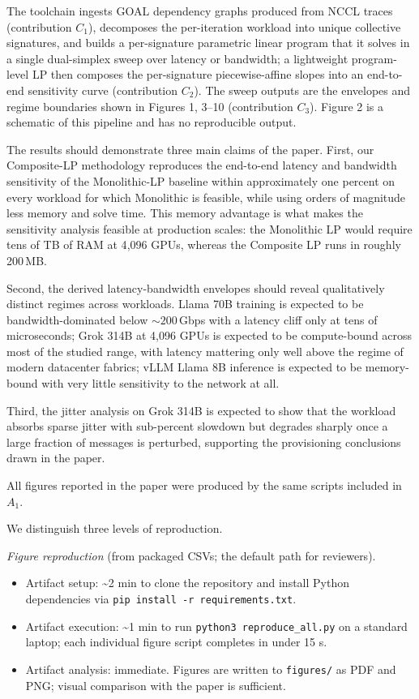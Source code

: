 \documentclass[conference]{IEEEtran}
\begin{document}
The toolchain ingests GOAL dependency graphs produced from NCCL
traces (contribution $C_1$), decomposes the per-iteration workload
into unique collective signatures, and builds a per-signature
parametric linear program that it solves in a single dual-simplex
sweep over latency or bandwidth; a lightweight program-level LP
then composes the per-signature piecewise-affine slopes into an
end-to-end sensitivity curve (contribution $C_2$). The sweep
outputs are the envelopes and regime boundaries shown in Figures
1, 3--10 (contribution $C_3$). Figure 2 is a schematic of this
pipeline and has no reproducible output.

\artexp

The results should demonstrate three main claims of the paper.
First, our Composite-LP methodology reproduces the end-to-end
latency and bandwidth sensitivity of the Monolithic-LP baseline
within approximately one percent on every workload for which
Monolithic is feasible, while using orders of magnitude less memory
and solve time. This memory advantage is what makes the
sensitivity analysis feasible at production scales: the Monolithic
LP would require tens of TB of RAM at 4{,}096 GPUs, whereas the
Composite LP runs in roughly 200\,MB.

Second, the derived latency-bandwidth envelopes should reveal
qualitatively distinct regimes across workloads. Llama 70B training
is expected to be bandwidth-dominated below ${\sim}200$\,Gbps with a
latency cliff only at tens of microseconds; Grok 314B at
4{,}096 GPUs is expected to be compute-bound across most of the
studied range, with latency mattering only well above the regime of
modern datacenter fabrics; vLLM Llama 8B inference is expected to
be memory-bound with very little sensitivity to the network at all.

Third, the jitter analysis on Grok 314B is expected to show that
the workload absorbs sparse jitter with sub-percent slowdown but
degrades sharply once a large fraction of messages is perturbed,
supporting the provisioning conclusions drawn in the paper.

All figures reported in the paper were produced by the same scripts
included in $A_1$.

\arttime

We distinguish three levels of reproduction.

\emph{Figure reproduction} (from packaged CSVs; the default path
for reviewers).

\begin{itemize}
\item Artifact setup: \textasciitilde2 min to clone the repository
  and install Python dependencies via
  \texttt{pip install -r requirements.txt}.
\item Artifact execution: \textasciitilde1 min to run
  \texttt{python3 reproduce\_all.py} on a standard laptop; each
  individual figure script completes in under 15 s.
\item Artifact analysis: immediate. Figures are written to
  \texttt{figures/} as PDF and PNG; visual comparison with the paper
  is sufficient.
\end{itemize}
\end{document}
